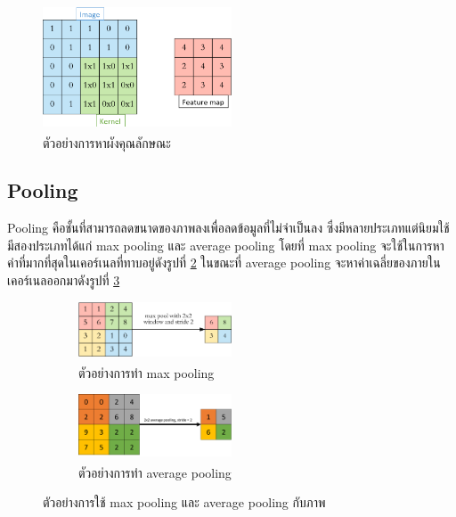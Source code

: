 \begin{figure}[!ht]
	\centering
	\includegraphics[width=0.5\textwidth]{chapter2/images/feature_map.png}
		\caption[ตัวอย่างการหาผังคุณลักษณะ]{ตัวอย่างการหาผังคุณลักษณะ\textsuperscript{\cite{cnn}}}
    	\label{fig:example feature map}
\end{figure}

\subsection*{Pooling}
Pooling คือชั้นที่สามารถลดขนาดของภาพลงเพื่อลดข้อมูลที่ไม่จำเป็นลง ซึ่งมีหลายประเภทแต่นิยมใช้มีสองประเภทได้แก่ max pooling และ average pooling
โดยที่ max pooling จะใช้ในการหาค่าที่มากที่สุดในเคอร์เนลที่ทาบอยู่ดังรูปที่ \ref{fig:example max pooling} ในขณะที่ average pooling 
จะหาค่าเฉลี่ยของภายในเคอร์เนลออกมาดังรูปที่ \ref{fig:example average pooling}
\begin{figure}[!ht]
	\centering
	\begin{subfigure}[b]{1.0\textwidth}
		\centering
		\includegraphics[width=0.5\textwidth]{chapter2/images/max_pooling.png}
		\caption{ตัวอย่างการทำ max pooling\textsuperscript{\cite{cnn}}}
		\label{fig:example max pooling}
    \end{subfigure}
    \begin{subfigure}[b]{1.0\textwidth}
        \centering
		\includegraphics[width=0.5\textwidth]{chapter2/images/average_pooling.png}
		\caption{ตัวอย่างการทำ average pooling\textsuperscript{\cite{average_pooling}}}
		\label{fig:example average pooling}
	\end{subfigure}
	\caption{ตัวอย่างการใช้ max pooling และ average pooling กับภาพ}
	\label{fig:pooling_ex}
\end{figure}
\clearpage

